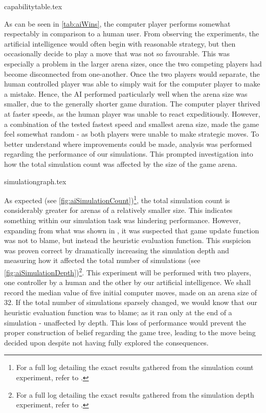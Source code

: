 \documentclass{standalone}
\begin{document}
		{capabilitytable.tex}

		As can be seen in \autoref{tab:aiWins}, the computer player performs somewhat respectably in comparison to a human user. From observing the experiments, the artificial intelligence would often begin with reasonable strategy, but then occasionally decide to play a move that was not so favourable. This was especially a problem in the larger arena sizes, once the two competing players had become disconnected from one-another. Once the two players would separate, the human controlled player was able to simply wait for the computer player to make a mistake. Hence, the AI performed particularly well when the arena size was smaller, due to the generally shorter game duration. The computer player thrived at faster speeds, as the human player was unable to react expeditiously. However, a combination of the tested fastest speed and smallest arena size, made the game feel somewhat random - as both players were unable to make strategic moves. To better understand where improvements could be made, analysis was performed regarding the performance of our simulations. This prompted investigation into how the total simulation count was affected by the size of the game arena.

		{simulationgraph.tex}
		\FloatBarrier

	 	As expected (see \autoref{fig:aiSimulationCount})\footnote{For a full log detailing the exact results gathered from the simulation count experiment, refer to .}, the total simulation count is considerably greater for arenas of a relatively smaller size. This indicates something within our simulation task was hindering performance. However, expanding from what was shown in , it was suspected that game update function was not to blame, but instead the heuristic evaluation function. This suspicion was proven correct by dramatically increasing the simulation depth and measuring how it affected the total number of simulations (see \autoref{fig:aiSimulationDepth})\footnote{For a full log detailing the exact results gathered from the simulation depth experiment, refer to .}. This experiment will be performed with two players, one controller by a human and the other by our artificial intelligence. We shall record the median value of five initial computer moves, made on an arena size of 32. If the total number of simulations sparsely changed, we would know that our heuristic evaluation function was to blame; as it ran only at the end of a simulation - unaffected by depth. This loss of performance would prevent the proper construction of belief regarding the game tree, leading to the move being decided upon despite not having fully explored the consequences.
\end{document}
